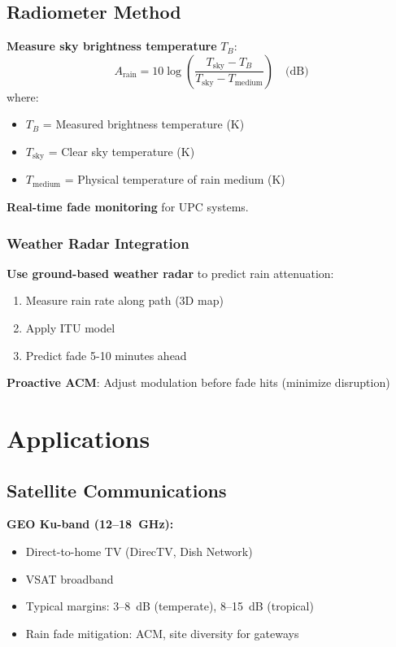 \subsection{Radiometer Method}

\textbf{Measure sky brightness temperature} $T_B$:
\begin{equation}
A_{\text{rain}} = 10 \log\left(\frac{T_{\text{sky}} - T_B}{T_{\text{sky}} - T_{\text{medium}}}\right) \quad \text{(dB)}
\end{equation}
where:
\begin{itemize}
\item $T_B$ = Measured brightness temperature (K)
\item $T_{\text{sky}}$ = Clear sky temperature (K)
\item $T_{\text{medium}}$ = Physical temperature of rain medium (K)
\end{itemize}

\textbf{Real-time fade monitoring} for UPC systems.

\subsubsection{Weather Radar
Integration}\label{weather-radar-integration}

\textbf{Use ground-based weather radar} to predict rain attenuation:

\begin{enumerate}
\def\labelenumi{\arabic{enumi}.}
\tightlist
\item
  Measure rain rate along path (3D map)
\item
  Apply ITU model
\item
  Predict fade 5-10 minutes ahead
\end{enumerate}

\textbf{Proactive ACM}: Adjust modulation before fade hits (minimize disruption)

\section{Applications}

\subsection{Satellite Communications}

\textbf{GEO Ku-band (12--18~GHz):}
\begin{itemize}
\item Direct-to-home TV (DirecTV, Dish Network)
\item VSAT broadband
\item Typical margins: 3--8~dB (temperate), 8--15~dB (tropical)
\item Rain fade mitigation: ACM, site diversity for gateways
\end{itemize}

